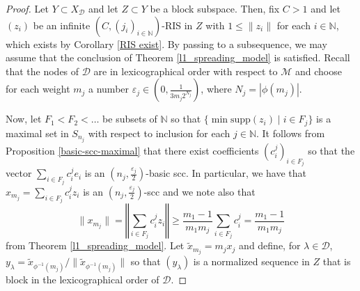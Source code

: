 \documentclass[12pt,a4paper]{amsart}
\newcommand{\N}{\mathbb{N}}
\newcommand{\bes}{\begin{equation*}}
\newcommand{\ees}{\end{equation*}}
\newcommand{\ep}{\varepsilon}
\newcommand{\supp}{\text{supp}}
\theoremstyle{definition}
\theoremstyle{plain}
\begin{document}
\begin{proof}
Let $Y\subset X_{\mathcal{D}}$ and let $Z\subset Y$ be a block subspace. Then, fix $C> 1$ and let $(z_{i})$ be an infinite $(C,(j_{i})_{i\in\N})$-RIS in $Z$ with $1\leq\|z_{i}\|$ for each $i\in\N${, which exists by Corollary \ref{RIS exist}. By passing to a subsequence, we may assume that the conclusion of Theorem \ref{l1_spreading_model} is satisfied.} Recall that the nodes of $\mathcal{D}$ are in lexicographical order with respect to $\mathcal{M}$ and choose for each weight $m_{j}$ a number $\ep_{j}\in\left(0,\frac{1}{3m_{j}2^{N_{j}}}\right)$, where {$N_j = |\phi(m_j)|$.}

Now, let $F_{1}<F_{2}<\ldots$ be subsets of $\N$ so that $\{\min\supp(z_{i}) \mid i\in F_{j}\}$ is a maximal set in $S_{n_{j}}$ with respect to inclusion for each $j\in\N$. It follows from Proposition \ref{basic-scc-maximal} that there exist coefficients $(c^{j}_{i})_{i\in F_{j}}$ so that the vector $\sum_{i\in F_{j}}c^{j}_{i}e_{i}$ is an $(n_{j},\frac{\ep_{j}}{2})$-basic scc. In particular, we have that $x_{m_j}=\sum_{i\in F_{j}}c^{j}_{i}z_{i}$ is an $(n_{j},\frac{\ep_{j}}{2})$-scc and we note also that
\bes \|x_{m_j}\|=\left\Vert\sum_{i\in F_{j}}c^{j}_{i}z_{i}\right\Vert \geq \frac{m_{1}-1}{m_{1}m_{j}}\sum_{i\in F_{j}}c^{j}_{i}=\frac{m_{1}-1}{m_{1}m_{j}}\ees
from Theorem \ref{l1_spreading_model}. Let $\tilde{x}_{m_j}=m_{j}x_{j}$ and define, for $\lambda\in\mathcal{D}$, $y_{\lambda}= \tilde x_{\phi^{-1}(m_j)}/\|\tilde x_{\phi^{-1}(m_j)}\|$ so that $(y_{\lambda})$ is a normalized sequence in $Z$ that is block in the lexicographical order of $\mathcal{D}$.



\end{proof}
\end{document}
